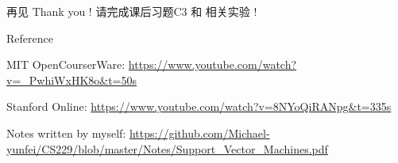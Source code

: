 \documentclass[handout]{ctexbeamer}
\begin{document}
\begin{frame}{再见}
	Thank you !  请完成课后习题C3 和 相关实验 !
\end{frame}



\begin{frame}[allowframebreaks]{Reference}
  
  
  MIT OpenCourserWare: \url{https://www.youtube.com/watch?v=_PwhiWxHK8o&t=50s} 
  
  Stanford Online: \url{https://www.youtube.com/watch?v=8NYoQiRANpg&t=335s}
  
  Notes written by myself: \url{https://github.com/Michael-yunfei/CS229/blob/master/Notes/Support_Vector_Machines.pdf} 
\end{frame}
\end{document}
